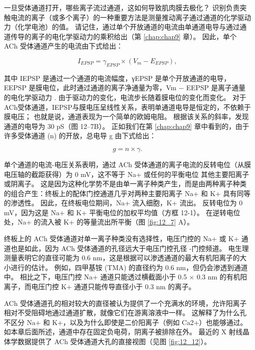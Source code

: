 一旦受体通道打开，哪些离子流过通道，这如何导致肌肉膜去极化？
识别负责突触电流的离子（或多个离子）的一种重要方法是测量推动离子通过通道的化学驱动力（化学电池）的值。
请记住，通过单个开放通道的电流由单通道电导与通过通道传导的离子的电化学驱动力的乘积给出（第 \ref{chap:chap9} 章）。 
因此，单个 ACh 受体通道产生的电流由下式给出：


\begin{equation}
	I_{EPSP} = \gamma_{EPSP}\times (V_m - E_{EPSP}),
\end{equation}

其中 IEPSP 是通过一个通道的电流幅度，γEPSP 是单个开放通道的电导，EEPSP 是膜电位，此时通过通道的离子净通量为零，Vm − EEPSP 是离子通量的电化学驱动力 . 由于驱动力的变化，电流步长随着膜电位的变化而变化。 
对于ACh受体通道，IEPSP与膜电压呈线性关系，表明单通道电导是恒定的，不依赖于膜电压； 也就是说，通道表现为一个简单的欧姆电阻。 
根据该关系的斜率，发现通道的电导为 30 pS（图 12–7B）。 
正如我们在第 \ref{chap:chap9} 章中看到的，由于许多受体通道 (n) 的开放，总电导 g 由下式给出：

\begin{equation}
	g = n \times \gamma.
\end{equation}

单个通道的电流-电压关系表明，通过 ACh 受体通道的离子电流的反转电位（从膜电压轴的截距获得）为 0 mV，这不等于 Na+ 或任何的平衡电位 其他主要阳离子或阴离子。 
这是因为这种化学势不是由单一离子种类产生，而是由两种离子种类的组合产生：终板上的配体门控通道几乎对两种主要阳离子 Na+ 和 K+ 具有同等的渗透性。 
因此，在终板电位期间，Na+ 流入细胞，K+ 流出。 
反转电位为 0 mV，因为这是 Na+ 和 K+ 平衡电位的加权平均值（方框 12-1）。 
在逆转电位处，Na+ 的流入被 K+ 的等量流出所平衡（图 \ref{fig:12_7} A）。


终板上的 ACh 受体通道对单一离子种类没有选择性，电压门控的 Na+ 或 K+ 通道也是如此，因为 ACh 受体通道的孔径远大于电压门控孔径 -门控频道。 
电生理测量表明它的直径可能为 0.6 nm，这是根据可以渗透通道的最大有机阳离子的大小进行的估计。 
例如，四甲基铵 (TMA) 的直径约为 0.6 nm，但仍会渗透到通道中。 
相比之下，电压门控 Na+ 通道只能透过横截面小于 0.5 × 0.3 nm 的有机阳离子，而电压门控 K+ 通道只能传导直径小于 0.3 nm 的离子。


ACh 受体通道孔的相对较大的直径被认为提供了一个充满水的环境，允许阳离子相对不受阻碍地通过通道扩散，就像它们在游离溶液中一样。
这解释了为什么孔不区分 Na+ 和 K+，以及为什么即使是二价阳离子（例如 Ca2+）也能够通过。 
如本章后面所述，通道中存在固定负电荷，阴离子被排除在外。 
最近的 X 射线晶体学数据提供了 ACh 受体通道大孔的直接视图（见图 \ref{fig:12_12}）。

